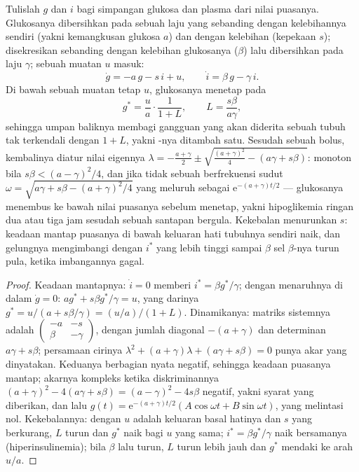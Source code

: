 \begin{theorem}\label{thm:b3:endocrinology:loop}
Tulislah $g$ dan $i$ bagi simpangan glukosa dan  plasma dari
nilai puasanya. Glukosanya dibersihkan pada sebuah laju yang sebanding dengan
kelebihannya sendiri (yakni kemangkusan glukosa $a$) dan dengan kelebihan 
(kepekaan $s$);  disekresikan sebanding dengan kelebihan
glukosanya ($\beta$) lalu dibersihkan pada laju $\gamma$; sebuah muatan $u$ masuk:
\[
\dot g = -a\,g - s\,i + u, \qquad \dot i = \beta\,g - \gamma\,i .
\]
Di bawah sebuah muatan tetap $u$, glukosanya menetap pada
\[
g^{*} = \frac{u}{a}\cdot\frac{1}{1 + L}, \qquad L = \frac{s\beta}{a\gamma},
\]
sehingga umpan baliknya membagi gangguan yang akan diderita sebuah tubuh
tak terkendali dengan $1 + L$, yakni \emph{}-nya ditambah satu. Sesudah sebuah bolus,
kembalinya diatur nilai eigennya
$\lambda = -\tfrac{a + \gamma}{2} \pm \sqrt{\tfrac{(a+\gamma)^{2}}{4} - (a\gamma + s\beta)}$:
monoton bila $s\beta < (a - \gamma)^{2}/4$, dan jika tidak sebuah  berfrekuensi sudut $\omega = \sqrt{a\gamma + s\beta -
(a+\gamma)^{2}/4}$ yang meluruh sebagai $\mathrm{e}^{-(a+\gamma)t/2}$ --- glukosanya
menembus ke bawah nilai puasanya sebelum menetap, yakni
hipoglikemia ringan dua atau tiga jam sesudah sebuah santapan bergula. Kekebalan
 menurunkan $s$: keadaan mantap puasanya di bawah keluaran hati tubuhnya
sendiri naik, dan gelungnya mengimbangi dengan $i^{*}$ yang lebih tinggi
sampai $\beta$ sel $\beta$-nya turun pula, ketika imbangannya gagal.
\end{theorem}
\begin{proof}
Keadaan mantapnya: $\dot i = 0$ memberi $i^{*} = \beta g^{*}/\gamma$; dengan menaruhnya
di dalam $\dot g = 0$: $a g^{*} + s\beta g^{*}/\gamma = u$, yang darinya $g^{*} =
u/(a + s\beta/\gamma) = (u/a)/(1 + L)$. Dinamikanya: matriks sistemnya adalah
$\begin{pmatrix} -a & -s\\ \beta & -\gamma\end{pmatrix}$, dengan jumlah diagonal
$-(a+\gamma)$ dan determinan $a\gamma + s\beta$; persamaan cirinya
$\lambda^{2} + (a+\gamma)\lambda + (a\gamma + s\beta) = 0$ punya
akar yang dinyatakan. Keduanya berbagian nyata negatif, sehingga keadaan puasanya
mantap; akarnya kompleks ketika diskriminannya $(a+\gamma)^{2}
- 4(a\gamma + s\beta) = (a-\gamma)^{2} - 4s\beta$ negatif, yakni
syarat yang diberikan, dan lalu $g(t) = \mathrm{e}^{-(a+\gamma)t/2}(A\cos\omega t
+ B\sin\omega t)$, yang melintasi nol. Kekebalannya: dengan $u$ adalah keluaran
basal hatinya dan $s$ yang berkurang, $L$ turun dan $g^{*}$ naik bagi $u$ yang sama;
$i^{*} = \beta g^{*}/\gamma$ naik bersamanya (hiperinsulinemia);
bila $\beta$ lalu turun, $L$ turun lebih jauh dan $g^{*}$ mendaki ke arah $u/a$.
\end{proof}

